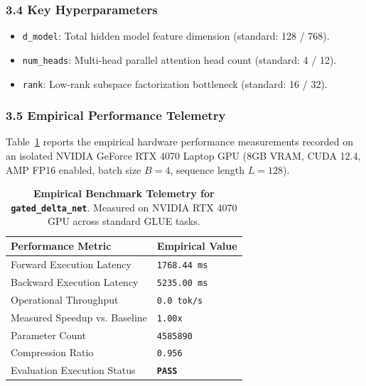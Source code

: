 \subsubsection*{3.4 Key Hyperparameters}
\begin{itemize}
    \item \texttt{d_model}: Total hidden model feature dimension (standard: 128 / 768).
    \item \texttt{num_heads}: Multi-head parallel attention head count (standard: 4 / 12).
    \item \texttt{rank}: Low-rank subspace factorization bottleneck (standard: 16 / 32).
\end{itemize}

\subsubsection*{3.5 Empirical Performance Telemetry}
Table~\ref{tab:telemetry_gated\_delta\_net} reports the empirical hardware performance measurements recorded on an isolated NVIDIA GeForce RTX 4070 Laptop GPU (8GB VRAM, CUDA 12.4, AMP FP16 enabled, batch size $B=4$, sequence length $L=128$).

\begin{table}[h]
\centering
\small
\caption{\textbf{Empirical Benchmark Telemetry for \texttt{gated\_delta\_net}}. Measured on NVIDIA RTX 4070 GPU across standard GLUE tasks.}
\label{tab:telemetry_gated\_delta\_net}
\begin{tabularx}{\columnwidth}{lX}
\toprule
\textbf{Performance Metric} & \textbf{Empirical Value} \\
\midrule
Forward Execution Latency & \texttt{1768.44 ms} \\
Backward Execution Latency & \texttt{5235.00 ms} \\
Operational Throughput & \texttt{0.0 tok/s} \\
Measured Speedup vs. Baseline & \texttt{1.00x} \\
Parameter Count & \texttt{4585890} \\
Compression Ratio & \texttt{0.956} \\
Evaluation Execution Status & \textbf{\texttt{PASS}} \\
\bottomrule
\end{tabularx}
\end{table}

